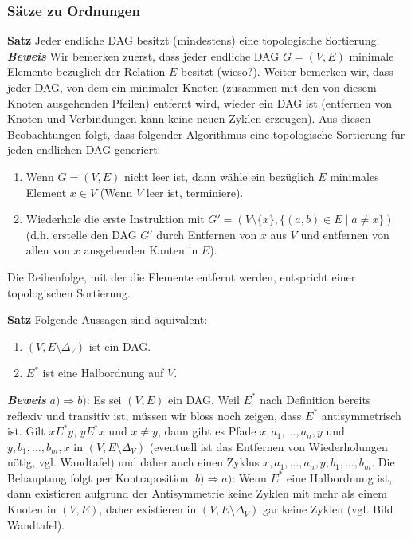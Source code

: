 \subsubsection{Sätze zu Ordnungen}
\textbf{Satz } Jeder endliche DAG besitzt (mindestens) eine topologische Sortierung. \\
\textbf{\textit{Beweis }} Wir bemerken zuerst, dass jeder endliche DAG $G=(V,E)$ minimale Elemente bezüglich der Relation $E$ besitzt (wieso?). Weiter bemerken wir, dass jeder DAG, von dem ein minimaler Knoten (zusammen mit den von diesem Knoten ausgehenden Pfeilen) entfernt wird, wieder ein DAG ist (entfernen von Knoten und Verbindungen kann keine neuen Zyklen erzeugen). Aus diesen Beobachtungen folgt, dass folgender Algorithmus eine topologische Sortierung für jeden endlichen DAG generiert:
\begin{enumerate}
	\item Wenn $G=(V,E)$ nicht leer ist, dann wähle ein bezüglich $E$ minimales Element $x\in V$ (Wenn $V$ leer ist, terminiere).
	\item Wiederhole die erste Instruktion mit $G'=(V\setminus \{x\},\{(a,b)\in E\mid a\neq x \})$ (d.h. erstelle den DAG $G'$ durch Entfernen von $x$ aus $V$ und entfernen von allen von $x$ ausgehenden Kanten in $E$).
\end{enumerate}
Die Reihenfolge, mit der die Elemente entfernt werden, entspricht einer topologischen Sortierung.

\textbf{Satz } Folgende Aussagen sind äquivalent:
\begin{enumerate}
	\item $(V,E\setminus \Delta_V)$ ist ein DAG.
	\item $E^*$ ist eine Halbordnung auf $V$.
\end{enumerate}
\textbf{\textit{Beweis }}         $a)\Rightarrow b)$: Es sei $(V,E)$ ein DAG. Weil $E^*$ nach Definition bereits         reflexiv und transitiv ist, müssen wir bloss noch zeigen, dass $E^*$         antisymmetrisch ist. Gilt $xE^*y$, $yE^*x$ und $x\neq y$, dann gibt es         Pfade $x,a_1,\dots,a_n,y$ und $y,b_1,\dots,b_m,x$ in $(V,E\setminus \Delta_V)$ (eventuell ist das Entfernen von Wiederholungen nötig, vgl. Wandtafel) und daher auch         einen Zyklus $x,a_1,\dots,a_n,y,b_1,\dots,b_m$. Die Behauptung folgt per         Kontraposition.
$b)\Rightarrow a)$: Wenn $E^*$ eine Halbordnung ist, dann existieren aufgrund der         Antisymmetrie keine Zyklen mit mehr als einem Knoten in $(V,E)$, daher existieren in         $(V,E\setminus\Delta_V)$ gar keine Zyklen (vgl. Bild Wandtafel).

